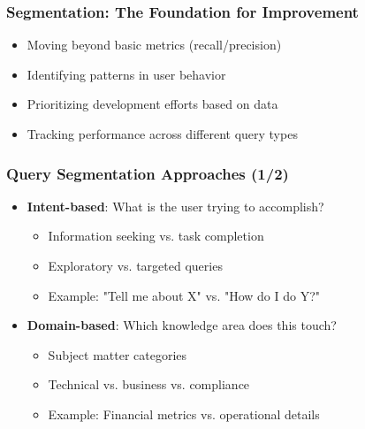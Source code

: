 
\begin{frame}
    \frametitle{Segmentation: The Foundation for Improvement}
    
    \begin{center}
    \end{center}
    
    \begin{itemize}
        \item Moving beyond basic metrics (recall/precision)
        \item Identifying patterns in user behavior
        \item Prioritizing development efforts based on data
        \item Tracking performance across different query types
    \end{itemize}
    
    \begin{center}
    \end{center}
\end{frame}

\begin{frame}
    \frametitle{Query Segmentation Approaches (1/2)}
    \begin{itemize}
        \item \textbf{Intent-based}: What is the user trying to accomplish?
        \begin{itemize}
            \item Information seeking vs. task completion
            \item Exploratory vs. targeted queries
            \item Example: "Tell me about X" vs. "How do I do Y?"
        \end{itemize}
        \item \textbf{Domain-based}: Which knowledge area does this touch?
        \begin{itemize}
            \item Subject matter categories
            \item Technical vs. business vs. compliance
            \item Example: Financial metrics vs. operational details
        \end{itemize}
    \end{itemize}
\end{frame}

